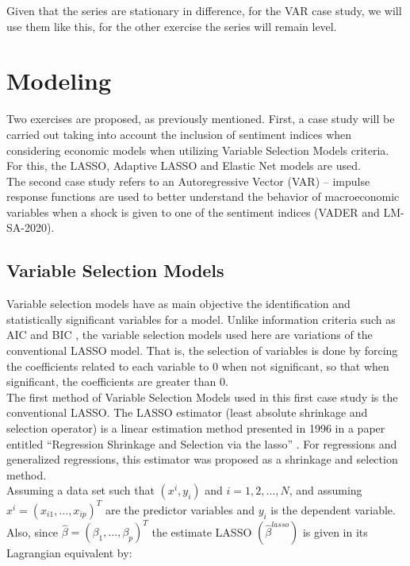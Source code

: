 Given that the series are stationary in difference, for the VAR case study, we will use them like this, for the other exercise the series will remain level.

\section{Modeling}

Two exercises are proposed, as previously mentioned. First, a case study will be carried out taking into account the inclusion of sentiment indices when considering economic models when utilizing Variable Selection Models criteria. For this, the LASSO, Adaptive LASSO and Elastic Net models are used.\\

The second case study refers to an Autoregressive Vector (VAR) -- impulse response functions are used to better understand the behavior of macroeconomic variables when a shock is given to one of the sentiment indices (VADER and LM- SA-2020).\\

\subsection{Variable Selection Models}

Variable selection models have as main objective the identification and statistically significant variables for a model. Unlike information criteria such as AIC \cite[]{akaike1974new} and BIC \cite[]{schwarz1978estimating}, the variable selection models used here are variations of the conventional LASSO model. That is, the selection of variables is done by forcing the coefficients related to each variable to 0 when not significant, so that when significant, the coefficients are greater than 0.\\

The first method of Variable Selection Models used in this first case study is the conventional LASSO. The LASSO estimator (least absolute shrinkage and selection operator) is a linear estimation method presented in 1996 in a paper entitled ``Regression Shrinkage and Selection via the lasso'' \cite[]{tibshirani1996regression}. For regressions and generalized regressions, this estimator was proposed as a shrinkage and selection method.\\

Assuming a data set such that $(x^i, y_i)$ and $i = 1, 2, \dots , N$, and assuming $x^i = (x_{i1}, \dots, x_{ip})^T$ are the predictor variables and $y_i$ is the dependent variable. Also, since $\hat{\beta} = (\beta_1, \dots, \beta_p)^T$ the estimate LASSO $(\hat{\beta}^{lasso})$ \cite[p. 268]{tibshirani1996regression} is given in its Lagrangian equivalent by:

